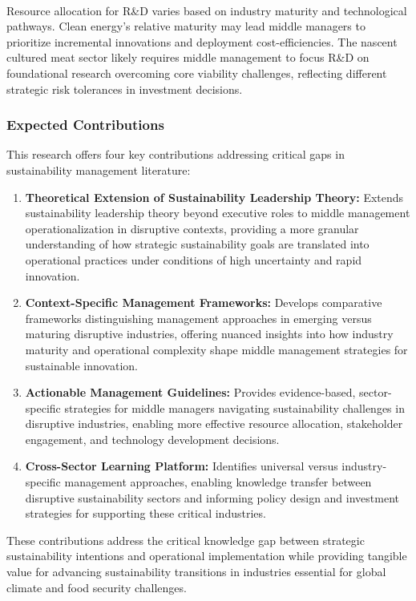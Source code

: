 \begin{enumerate}
		\paragraph*{} Resource allocation for R\&D varies based on industry maturity and technological pathways. Clean energy’s relative maturity may lead middle managers to prioritize incremental innovations and deployment cost-efficiencies. The nascent cultured meat sector likely requires middle management to focus R\&D on foundational research overcoming core viability challenges, reflecting different strategic risk tolerances in investment decisions. 
	\end{enumerate}
	
	\subsubsection{Expected Contributions}
	This research offers four key contributions addressing critical gaps in sustainability management literature:
	\begin{enumerate}
		\item \textbf{Theoretical Extension of Sustainability Leadership Theory:} Extends sustainability leadership theory beyond executive roles to middle management operationalization in disruptive contexts, providing a more granular understanding of how strategic sustainability goals are translated into operational practices under conditions of high uncertainty and rapid innovation.
		\item \textbf{Context-Specific Management Frameworks:} Develops comparative frameworks distinguishing management approaches in emerging versus maturing disruptive industries, offering nuanced insights into how industry maturity and operational complexity shape middle management strategies for sustainable innovation.
		\item \textbf{Actionable Management Guidelines:} Provides evidence-based, sector-specific strategies for middle managers navigating sustainability challenges in disruptive industries, enabling more effective resource allocation, stakeholder engagement, and technology development decisions.
		\item \textbf{Cross-Sector Learning Platform:} Identifies universal versus industry-specific management approaches, enabling knowledge transfer between disruptive sustainability sectors and informing policy design and investment strategies for supporting these critical industries.
	\end{enumerate}
	These contributions address the critical knowledge gap between strategic sustainability intentions and operational implementation while providing tangible value for advancing sustainability transitions in industries essential for global climate and food security challenges.
	
